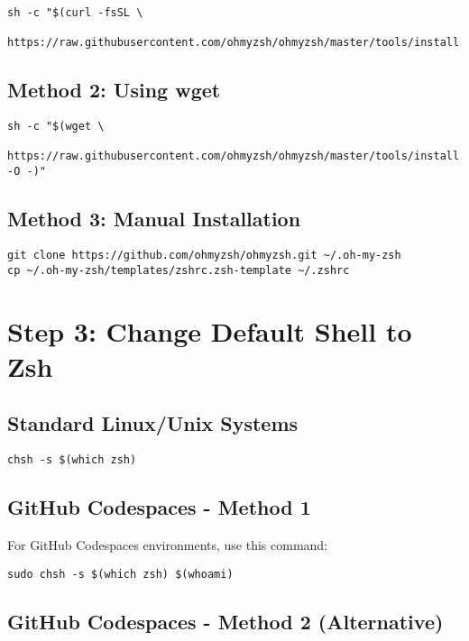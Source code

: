 \documentclass{article}
\begin{document}
\begin{verbatim}
sh -c "$(curl -fsSL \
  https://raw.githubusercontent.com/ohmyzsh/ohmyzsh/master/tools/install.sh)"
\end{verbatim}

\subsection{Method 2: Using wget}

\begin{verbatim}
sh -c "$(wget \
  https://raw.githubusercontent.com/ohmyzsh/ohmyzsh/master/tools/install.sh -O -)"
\end{verbatim}

\subsection{Method 3: Manual Installation}

\begin{verbatim}
git clone https://github.com/ohmyzsh/ohmyzsh.git ~/.oh-my-zsh
cp ~/.oh-my-zsh/templates/zshrc.zsh-template ~/.zshrc
\end{verbatim}

\section{Step 3: Change Default Shell to Zsh}

\subsection{Standard Linux/Unix Systems}

\begin{verbatim}
chsh -s $(which zsh)
\end{verbatim}

\subsection{GitHub Codespaces - Method 1}

For GitHub Codespaces environments, use this command:

\begin{verbatim}
sudo chsh -s $(which zsh) $(whoami)
\end{verbatim}

\subsection{GitHub Codespaces - Method 2 (Alternative)}
\end{document}
